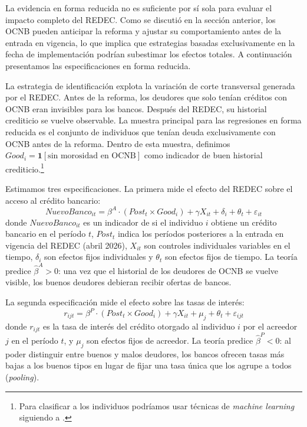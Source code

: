 \documentclass[11pt]{article}
\theoremstyle{plain}
\theoremstyle{plain}
\begin{document}
La evidencia en forma reducida no es suficiente por sí sola para evaluar el impacto completo del REDEC. Como se discutió en la sección anterior, los OCNB pueden anticipar la reforma y ajustar su comportamiento antes de la entrada en vigencia, lo que implica que estrategias basadas exclusivamente en la fecha de implementación podrían subestimar los efectos totales. A continuación presentamos las especificaciones en forma reducida.

La estrategia de identificación explota la variación de corte transversal generada por el REDEC. Antes de la reforma, los deudores que solo tenían créditos con OCNB eran invisibles para los bancos. Después del REDEC, su historial crediticio se vuelve observable. La muestra principal para las regresiones en forma reducida es el conjunto de individuos que tenían deuda exclusivamente con OCNB antes de la reforma. Dentro de esta muestra, definimos $Good_i = \mathbf{1}[\text{sin morosidad en OCNB}]$ como indicador de buen historial crediticio.\footnote{Para clasificar a los individuos podríamos usar técnicas de \textit{machine learning} siguiendo a \textcite{liberman_equilibrium_2018}.}

Estimamos tres especificaciones. La primera mide el efecto del REDEC sobre el acceso al crédito bancario:
\begin{equation}
    NuevoBanco_{it} = \beta^A \cdot (Post_t \times Good_i) + \gamma X_{it} + \delta_i + \theta_t + \varepsilon_{it}
    \label{eqn:access}
\end{equation}
donde $NuevoBanco_{it}$ es un indicador de si el individuo $i$ obtiene un crédito bancario en el período $t$, $Post_t$ indica los períodos posteriores a la entrada en vigencia del REDEC (abril 2026), $X_{it}$ son controles individuales variables en el tiempo, $\delta_i$ son efectos fijos individuales y $\theta_t$ son efectos fijos de tiempo. La teoría predice $\hat{\beta}^A > 0$: una vez que el historial de los deudores de OCNB se vuelve visible, los buenos deudores debieran recibir ofertas de bancos.

La segunda especificación mide el efecto sobre las tasas de interés:
\begin{equation}
    r_{ijt} = \beta^P \cdot (Post_t \times Good_i) + \gamma X_{it} + \mu_j + \theta_t + \varepsilon_{ijt}
    \label{eqn:pricing}
\end{equation}
donde $r_{ijt}$ es la tasa de interés del crédito otorgado al individuo $i$ por el acreedor $j$ en el período $t$, y $\mu_j$ son efectos fijos de acreedor. La teoría predice $\hat{\beta}^P < 0$: al poder distinguir entre buenos y malos deudores, los bancos ofrecen tasas más bajas a los buenos tipos en lugar de fijar una tasa única que los agrupe a todos (\textit{pooling}).
\end{document}
